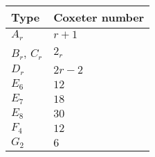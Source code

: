 \begin{tabular}{@{}ll@{}}\toprule
	Type & Coxeter number\\ \midrule
	$A_r$ & $r+1$ \\
	$B_r$, $C_r$ & $2_r$ \\
	$D_r$ & $2r-2$ \\
	$E_6$ & $12$ \\
	$E_7$ & $18$ \\
	$E_8$ & $30$ \\
	$F_4$ & $12$\\
	$G_2$ & $6$ \\ \bottomrule
\end{tabular}
